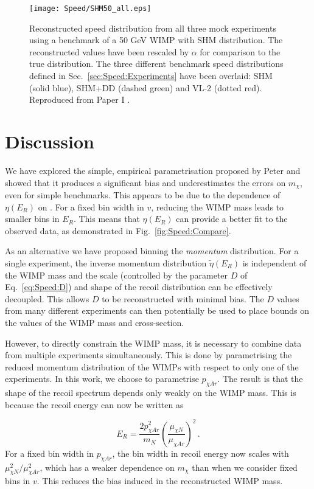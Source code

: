  \begin{figure}[t]
\centering
\texttt{[image: Speed/SHM50\_all.eps]}
\caption[Comparison of reconstructed speed distribution with three possible benchmark distributions]{Reconstructed speed distribution from all three mock experiments using a benchmark of a 50 GeV WIMP with SHM distribution. The reconstructed values have been rescaled by \(\alpha\) for comparison to the true distribution. The three different benchmark speed distributions defined in Sec.\ \ref{sec:Speed:Experiments} have been overlaid: SHM (solid blue), SHM+DD (dashed green) and VL-2 (dotted red). Reproduced from Paper I \cite{Kavanagh:2012}.}
  \label{fig:Speed:SHM50_all}
\end{figure}


\section{Discussion}
\label{sec:Speed:discussion}
We have explored the simple, empirical parametrisation proposed by Peter and showed that it produces a significant bias and underestimates the errors on $m_\chi$, even for simple benchmarks. This appears to be due to the dependence of $\eta(E_R)$ on \mchi. For a fixed bin width in $v$, reducing the WIMP mass leads to smaller bins in $E_R$. This means that $\eta(E_R)$ can provide a better fit to the observed data, as demonstrated in Fig.~\ref{fig:Speed:Compare}.

As an alternative we have proposed binning the \textit{momentum} distribution. For a single experiment, the inverse momentum distribution $\tilde{\eta}(E_R)$ is independent of the WIMP mass and the scale (controlled by the parameter $D$ of Eq.~\ref{eq:Speed:D}) and shape of the recoil distribution can be effectively decoupled. This allows $D$ to be reconstructed with minimal bias. The $D$ values from many different experiments can then potentially be used to place bounds on the values of the WIMP mass and cross-section.

However, to directly constrain the WIMP mass, it is necessary to combine data from multiple experiments simultaneously. This is done by parametrising the reduced momentum distribution of the WIMPs with respect to only one of the experiments. In this work, we choose to parametrise $p_{\chi Ar}$. The result is that the shape of the recoil spectrum depends only weakly on the WIMP mass. This is because the recoil energy can now be written as

\begin{equation}
E_R = \frac{2 p_{\chi Ar}^2}{m_N} \left(\frac{\mu_{\chi N}}{\mu_{\chi Ar}}\right)^2\,.
\end{equation}
For a fixed bin width in $p_{\chi Ar}$, the bin width in recoil energy now scales with $\mu_{\chi N}^2/ \mu_{\chi Ar}^2$, which has a weaker dependence on $m_\chi$ than when we consider fixed bins in $v$. This reduces the bias induced in the reconstructed WIMP mass.

